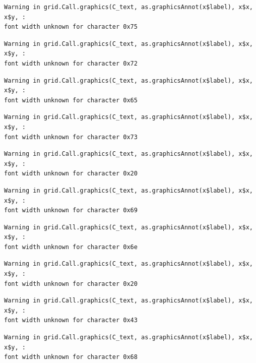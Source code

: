 \documentclass[
  letterpaper,
]{scrbook}
\begin{document}
\begin{verbatim}
Warning in grid.Call.graphics(C_text, as.graphicsAnnot(x$label), x$x, x$y, :
font width unknown for character 0x75
\end{verbatim}

\begin{verbatim}
Warning in grid.Call.graphics(C_text, as.graphicsAnnot(x$label), x$x, x$y, :
font width unknown for character 0x72
\end{verbatim}

\begin{verbatim}
Warning in grid.Call.graphics(C_text, as.graphicsAnnot(x$label), x$x, x$y, :
font width unknown for character 0x65
\end{verbatim}

\begin{verbatim}
Warning in grid.Call.graphics(C_text, as.graphicsAnnot(x$label), x$x, x$y, :
font width unknown for character 0x73
\end{verbatim}

\begin{verbatim}
Warning in grid.Call.graphics(C_text, as.graphicsAnnot(x$label), x$x, x$y, :
font width unknown for character 0x20
\end{verbatim}

\begin{verbatim}
Warning in grid.Call.graphics(C_text, as.graphicsAnnot(x$label), x$x, x$y, :
font width unknown for character 0x69
\end{verbatim}

\begin{verbatim}
Warning in grid.Call.graphics(C_text, as.graphicsAnnot(x$label), x$x, x$y, :
font width unknown for character 0x6e
\end{verbatim}

\begin{verbatim}
Warning in grid.Call.graphics(C_text, as.graphicsAnnot(x$label), x$x, x$y, :
font width unknown for character 0x20
\end{verbatim}

\begin{verbatim}
Warning in grid.Call.graphics(C_text, as.graphicsAnnot(x$label), x$x, x$y, :
font width unknown for character 0x43
\end{verbatim}

\begin{verbatim}
Warning in grid.Call.graphics(C_text, as.graphicsAnnot(x$label), x$x, x$y, :
font width unknown for character 0x68
\end{verbatim}
\end{document}
